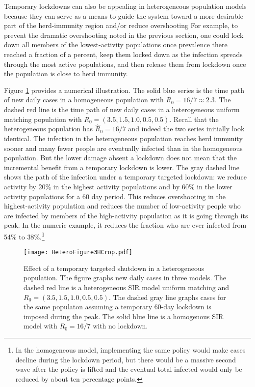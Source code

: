 \documentclass[11pt]{article}
\begin{document}
Temporary lockdowns can also be appealing in heterogeneous population models because they can serve as a means to guide
the system toward a more desirable part of the herd-immunity region and/or reduce overshooting For example, to prevent the dramatic overshooting noted
in the previous section, one could lock down all members of the lowest-activity populations once prevalence there reached
a fraction of a percent, keep them locked down as the infection spreads through the most active populations, and then release
them from lockdown once the population is close to herd immunity. 

Figure \ref{f:lockdown} provides a numerical illustration. The solid blue series is the time path of new daily cases in a homogeneous population with $R_0 = 16/7 \approx 2.3$. The dashed red line is the time path of new daily cases in a heterogeneous uniform matching population with 
$R_0 = (3.5, 1.5, 1.0, 0.5, 0.5)$. Recall that the heterogeneous population has $\hat{R}_0 = 16/7$ and indeed the two series initially look identical. The infection in the heterogeneous population reaches herd immunity sooner and many fewer people are eventually infected than in the homogeneous population. But the lower damage absent a lockdown does not mean that the incremental benefit from a temporary lockdown is lower. The gray dashed line shows the path of the infection under a temporary targeted lockdown: we reduce activity by 20\% in the highest activity populations and by 60\% in the lower activity populations for a 60 day period. This reduces overshooting in the highest-activity population and reduces the number of low-activity people who are infected by members of the high-activity population as it is going through its peak. In the numeric example, it reduces the fraction who are ever infected from 54\% to 38\%.\footnote{In the homogeneous model, implementing the same policy would make cases decline during the lockdown period, but there would be a massive second wave after the policy is lifted and the eventual total infected would only be reduced by about ten percentage points.}

\begin{figure}[htbp]
\noindent
\begin{center}
\texttt{[image: HeteroFigure3HCrop.pdf]}
\end{center}
\caption{Effect of a temporary targeted shutdown in a heterogeneous population. The figure graphs new daily cases in three models. The dashed red line
is a heterogeneous SIR model uniform matching and
$R_0= (3.5, 1.5, 1.0, 0.5, 0.5)$. The dashed gray
line graphs cases for the same populaton assuming a temporary 60-day lockdown is imposed during the peak. The solid blue line is a homogenous SIR model with $R_0=16/7$ with no lockdown.}
\label{f:lockdown}
\end{figure}
 
\end{document}
